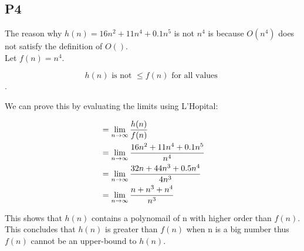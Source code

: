 \small \subsection*{P4}
The reason why $h(n) = 16n^2 + 11n^4 + 0.1n^5$ is not $n^4$ is because $O(n^4)$ does not satisfy the definition of $O()$.\\ Let $f(n) = n^4$.

$$h(n) \text{ is not }\leq f(n) \text{ for all values } $$.

We can prove this by evaluating the limits using L'Hopital:

\begin{align*}
    &= \lim_{n \to \infty} {{h(n) \over f(n)}}\\
    &= \lim_{n \to \infty} {{16n^2 + 11n^4 + 0.1n^5 \over n^4}}\\
    &= \lim_{n \to \infty} {{32n + 44n^3 + 0.5n^4 \over 4n^3}}\\
    &= \lim_{n \to \infty} {{n + n^3 + n^4 \over n^3}}
\end{align*}

This shows that $h(n)$ contains a polynomail of n with higher order than $f(n)$. This concludes that $h(n)$ is greater than $f(n)$ when n is a big number thus $f(n)$ cannot be an upper-bound to $h(n)$.



